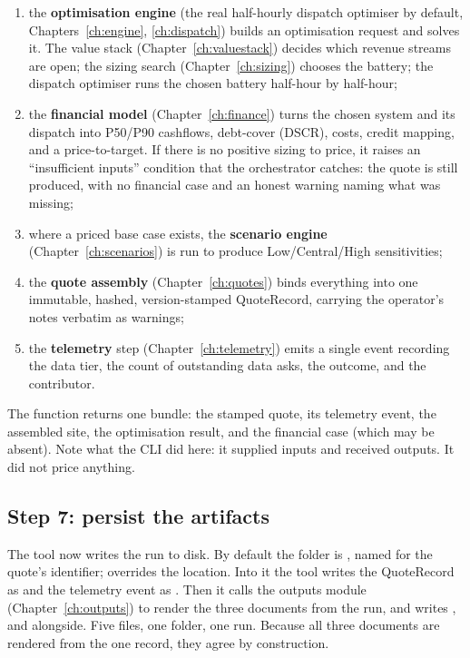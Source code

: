 \begin{enumerate}
  \item the \textbf{optimisation engine} (the real half-hourly dispatch optimiser by default, Chapters~\ref{ch:engine}, \ref{ch:dispatch}) builds an optimisation request and solves it. The value stack (Chapter~\ref{ch:valuestack}) decides which revenue streams are open; the sizing search (Chapter~\ref{ch:sizing}) chooses the battery; the dispatch optimiser runs the chosen battery half-hour by half-hour;
  \item the \textbf{financial model} (Chapter~\ref{ch:finance}) turns the chosen system and its dispatch into P50/P90 cashflows, debt-cover (DSCR), costs, credit mapping, and a price-to-target. If there is no positive sizing to price, it raises an ``insufficient inputs'' condition that the orchestrator catches: the quote is still produced, with no financial case and an honest warning naming what was missing;
  \item where a priced base case exists, the \textbf{scenario engine} (Chapter~\ref{ch:scenarios}) is run to produce Low/Central/High sensitivities;
  \item the \textbf{quote assembly} (Chapter~\ref{ch:quotes}) binds everything into one immutable, hashed, version-stamped QuoteRecord, carrying the operator's notes verbatim as warnings;
  \item the \textbf{telemetry} step (Chapter~\ref{ch:telemetry}) emits a single event recording the data tier, the count of outstanding data asks, the outcome, and the contributor.
\end{enumerate}

The function returns one bundle: the stamped quote, its telemetry event, the assembled site, the optimisation result, and the financial case (which may be absent). Note what the CLI did here: it supplied inputs and received outputs. It did not price anything.

\subsection{Step 7: persist the artifacts}

The tool now writes the run to disk. By default the folder is , named for the quote's identifier;  overrides the location. Into it the tool writes the QuoteRecord as  and the telemetry event as . Then it calls the outputs module (Chapter~\ref{ch:outputs}) to render the three documents from the run, and writes ,  and  alongside. Five files, one folder, one run. Because all three documents are rendered from the one record, they agree by construction.

